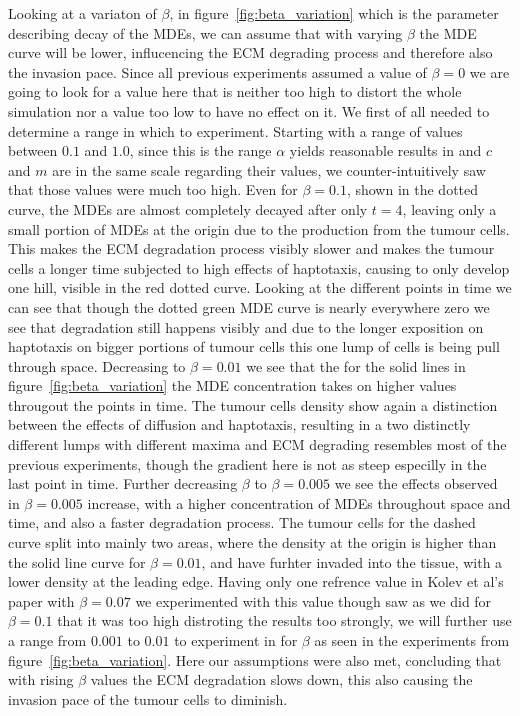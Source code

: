 Looking at a variaton of $\beta$, in figure~\ref{fig:beta_variation} which is the parameter describing decay of the MDEs, we can assume that with varying $\beta$ the MDE curve will be lower, influcencing the ECM degrading process and therefore also the invasion pace. Since all previous experiments assumed a value of $\beta=0$ we are going to look for a value here that is neither too high to distort the whole simulation nor a value too low to have no effect on it. We first of all needed to determine a range in which to experiment. Starting with a range of values between $0.1$ and $1.0$, since this is the range $\alpha$ yields reasonable results in and $c$ and $m$ are in the same scale regarding their values, we counter-intuitively saw that those values were much too high. Even for $\beta=0.1$, shown in the dotted curve, the MDEs are almost completely decayed after only $t=4$, leaving only a small portion of MDEs at the origin due to the production from the tumour cells.
This makes the ECM degradation process visibly slower and makes the tumour cells a longer time subjected to high effects of haptotaxis, causing to only develop one hill, visible in the red dotted curve.
Looking at the different points in time we can see that though the dotted green MDE curve is nearly everywhere zero we see that degradation still happens visibly and due to the longer exposition on haptotaxis on bigger portions of tumour cells this one lump of cells is being pull through space.
Decreasing to $\beta=0.01$ we see that the for the solid lines in figure~\ref{fig:beta_variation} the MDE concentration takes on higher values througout the points in time. The tumour cells density show again a distinction between the effects of diffusion and haptotaxis, resulting in a two distinctly different lumps with different maxima and ECM degrading resembles most of the previous experiments, though the gradient here is not as steep especilly in the last point in time. 
Further decreasing $\beta$ to $\beta = 0.005$ we see the effects observed in $\beta=0.005$ increase, with a higher concentration of MDEs throughout space and time, and also a faster degradation process. The tumour cells for the dashed curve split into mainly two areas, where the density at the origin is higher than the solid line curve for $\beta=0.01$, and have furhter invaded into the tissue, with a lower density at the leading edge.
Having only one refrence value in Kolev et al's\cite{Kolev2010} paper with $\beta=0.07$ we experimented with this value though saw as we did for $\beta=0.1$ that it was too high distroting the results too strongly, we will further use a range from $0.001$ to $0.01$ to experiment in for $\beta$ as seen in the experiments from figure~\ref{fig:beta_variation}. Here our assumptions were also met, concluding that with rising $\beta$ values the ECM degradation slows down, this also causing the invasion pace of the tumour cells to diminish.

